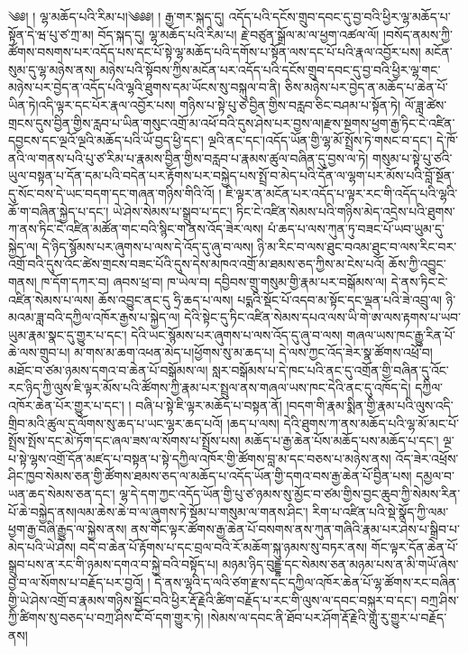 ༄༅། ། ལྷ་མཆོད་པའི་རིམ་པ།༄༅༅། ། རྒྱ་གར་སྐད་དུ། འདོད་པའི་དངོས་གྲུབ་དབང་དུ་བྱ་བའི་ཕྱིར་ལྷ་མཆོད་པ་སྟོན་དེ་ཝ་པུ་ཙ་ཀྲ་མ། བོད་སྐད་དུ། ལྷ་མཆོད་པའི་རིམ་པ། རྗེ་བཙུན་སྒྲོལ་མ་ལ་ཕྱག་འཚལ་ལོ། །བསོད་ནམས་ཀྱི་ཚོགས་བསགས་པར་འདོད་པས་དང་པོ་སྟེ་ལྷ་མཆོད་པའི་དགོས་པ་སྟོན་ལས་དང་པོ་པའི་རྣལ་འབྱོར་པས། མངོན་སུམ་དུ་ལྷ་མཉེས་ནས། མཉེས་པའི་སྟོབས་ཀྱིས་མངོན་པར་འདོད་པའི་དངོས་གྲུབ་དབང་དུ་བྱ་བའི་ཕྱིར་ལྷ་གང་མཉེས་པར་བྱེད་ན་འདོད་པའི་ལྷའི་ཐུགས་དམ་ཡོངས་སུ་བསྐུལ་བ་ནི། ཅིས་མཉེས་པར་བྱེད་ན་མཆོད་པ་ཆེན་པོ་ཡིན་ཏེ།འདི་ལྟར་དང་པོར་རྣལ་འབྱོར་པས། གཉིས་པ་སྟེ་པུ་ཙ་བྱིན་གྱིས་བརླབ་ཅིང་བཤམ་པ་སྟོན་ཏེ། ལོ་ཟླ་ཚེས་གྲངས་དུས་བྱིན་གྱིས་རླབ་པ་ཡིན་གསུང་འགྲོ་མ་འཕོ་བའི་དུས་ཤེས་པར་བྱས་ལ།རྫས་སྔགས་ཕྱག་རྒྱ་ཏིང་ངེ་འཛིན་དབྱངས་དང་ལྔའོ་ལྔའི་མཆོད་པའི་ཡོ་བྱད་ཕྱི་དང་། ལྔའི་ནང་དང་།འདོད་ཡོན་གྱི་ལྷ་མོ་སྤྲོས་ཏེ་གསང་བ་དང་། དེ་ཁོ་ནའི་ལ་གནས་པའི་པུ་ཙ་རིམ་པ་རྣམས་བྱིན་གྱིས་བརླབ་པ་རྣམས་ཚུལ་བཞིན་དུ་བྱས་ལ་ཏེ། གསུམ་པ་སྟེ་པུ་ཙའི་ཡུལ་བསྟན་པ་དོན་དམ་པའི་བདེན་པར་རྟོགས་པར་བསྐྱེད་པས་སྤྲོ་བ་མེད་པའི་དོན་ལ་ལྷག་པར་མོས་པའི་བློ་སྔོན་དུ་སོང་བས་དེ་ཡང་བདག་དང་གཞན་གཉིས་གིའི་འོ། ། ཇི་ལྟར་ན་མངོན་པར་འདོད་པ་ལྟར་རང་གི་འདོད་པའི་ལྷའི་ཆོ་ག་བཞིན་སྐྱེད་པ་དང་། ཡེ་ཤེས་སེམས་པ་སྒྲུབ་པ་དང་། ཏིང་ངེ་འཛིན་སེམས་པའི་གཉིས་མེད་འདྲེས་པའི་ཐུགས་ཀ་ནས་ཏིང་ངེ་འཛིན་མཚོན་གང་བའི་སྙིང་ག་ནས་འོད་ཟེར་ལས། པཾ་ཆད་པ་ལས་ཀུན་ཏུ་བཟང་པོ་ཡབ་ཡུམ་དུ་སྐྱེད་ལ། དེ་ཉིད་སྙོམས་པར་ཞུགས་པ་ལས་དེ་འོད་དུ་ཞུ་བ་ལས། ཉི་མ་རིང་བ་ལས་ཐུང་བའམ་ཐུང་བ་ལས་རིང་བར་འགྲོ་བའི་དུས་འོང་ཚེས་གྲངས་བཟང་པོའི་དུས་དེས་མཁའ་འགྲོ་མ་ཐམས་ཅད་ཀྱིས་མ་ངེས་པའོ། ཆོས་ཀྱི་འབྱུང་གནས། ཁ་དོག་དཀར་བ། ཞབས་ཕྲ་བ། ཁ་ཡེལ་བ། དབྱིབས་གྲུ་གསུམ་གྱི་རྣམ་པར་བསྒོམས་ལ། དེ་ནས་ཏིང་ངེ་འཛིན་སེམས་པ་ལས། ཆོས་འབྱུང་ནང་དུ ཧྲི་ཆད་པ་ལས། པདྨའི་སྡོང་པོ་འདབ་མ་སྟོང་དང་ལྡན་པའི་ཟེ་འབྲུ་ལ། ཉི་མའམ་ཟླ་བའི་དཀྱིལ་འཁོར་རྒྱས་པ་སྐྱེད་ལ། དེའི་སྟེང་དུ་ཏིང་འཛིན་སེམས་དཔའ་ལས་ཡི་གེ་ཨ་ལས་རྟགས་པ་ཡབ་ཡུམ་རྣམ་སྣང་དུ་གྱུར་པ་དང་། དེའི་ཡང་སྙོམས་པར་ཞུགས་པ་ལས་འོད་དུ་ཞུ་བ་ལས། གཞལ་ཡས་ཁང་རྒྱུ་རིན་པོ་ཆེ་ལས་གྲུབ་པ། མ་གས་མ་ཆག་འཕན་མེད་པ།ཕྱོགས་སུ་མ་ཆད་པ། དེ་ལས་ཀྱང་འོད་ཟེར་སྣ་ཚོགས་འཕྲོ་བ། མཐོང་བ་ཙམ་ཉམས་དགའ་བ་ཆེན་པོ་བསྒོམས་ལ། སླར་བསྒོམས་པ་དེ་ཁང་པའི་ནང་དུ་འགྲོན་གྱི་བཞིན་དུ་འོང་རང་ཉིད་ཀྱི་ལུས་ཇི་ལྟར་མོས་པའི་ཚོགས་ཀྱི་རྣམ་པར་སྤྲུལ་ནས་གཞལ་ཡས་ཁང་དེའི་ནང་དུ་འཁོད་དེ། དཀྱིལ་འཁོར་ཆེན་པོར་གྱུར་པ་དང་། ། བཞི་པ་སྟེ་ཇི་ལྟར་མཆོད་པ་བསྟན་ནོ། །བདག་གི་རྣམ་སྨིན་གྱི་རྣམ་པའི་ལུས་འདི་གྲིབ་མའི་ཚུལ་དུ་ལོགས་སུ་ཆད་པ་ཡང་ལྷར་ཆད་པའོ། །ཆད་པ་ལས། དེའི་ཐུགས་ཀ་ནས་མཆོད་པའི་ལྷ་མོ་མང་པོ་སྤྲོས་སྤོས་དང་མེ་ཏོག་དང་ཞལ་ཟས་ལ་སོགས་པ་སྤྲོས་པས། མཆོད་པ་རྒྱ་ཆེན་པོས་མཆོད་པས་མཆོད་པ་དང་། ལྔ་པ་སྟེ་ལྷས་འགྲོ་དོན་མཛད་པ་བསྟན་པ་སྟེ་དཀྱིལ་འཁོར་གྱི་ཚོགས་བླ་མ་དང་བཅས་པ་མཉེས་ནས། འོད་ཟེར་འཕྲོས་ཤིང་ཁྱབ་སེམས་ཅན་གྱི་ཚོགས་ཐམས་ཅད་ལ་མཆོད་པ་འདོད་ཡོན་གྱི་དགའ་བས་རྒྱ་ཆེན་པོ་བྱིན་པས། དམྱལ་བ་ཡན་ཆད་སེམས་ཅན་དང་། ལྷ་དེ་དག་ཀྱང་འདོད་ཡོན་གྱི་པུ་ཙ་ཉམས་སུ་མྱོང་བ་ཙམ་གྱིས་བྱང་ཆུབ་ཀྱི་སེམས་རིན་པོ་ཆེ་བསྐྱེད་ནས།ལམ་ཆེས་ཆེ་བ་ལ་ཞུགས་ཏེ་སྡོམ་པ་གསུམ་ལ་གནས་ཤིང་། རིག་པ་འཛིན་པའི་སྡེ་སྣོད་ཀྱི་ལམ་ཕྱག་རྒྱ་བཞི་རྒྱུད་ལ་སྐྱེས་ནས། ནས་གོང་ལྟར་ཚོགས་རྒྱ་ཆེན་པོ་བསགས་ནས་ཀུན་གཞིའི་རྣམ་པར་ཤེས་པ་སྒྲིབ་པ་མེད་པའི་ཡེ་ཤེས། བདེ་བ་ཆེན་པོ་རྟོགས་པ་དང་བྲལ་བའི་རོ་མཆོག་སྐུ་ཉམས་སུ་བཏར་ནས། གོང་ལྟར་དོན་ཆེན་པོ་སྒྲུབ་པས་ན་རང་གི་ཉམས་དགའ་བ་སྐྱེ་བའི་བསྟོད་པ། མཉམ་ཉིད་བུདྡྷ་དང་སེམས་ཅན་མཉམ་པས་ན་མི་གཡོ་ཞེས་བྱ་བ་ལ་སོགས་པ་བརྗོད་པར་བྱའོ། ། དེ་ནས་ལྷའི་ད་ལའི་ཙག་རྫས་དང་དཀྱིལ་འཁོར་ཆེན་པོ་ལྷ་ཚོགས་རང་བཞིན་གྱི་ཡེ་ཤེས་འགྲོ་བ་རྣམས་གཉིས་སྦྱོང་བའི་ཕྱིར་རྡོ་རྗེའི་ཚིག་བརྗོད་པ་རང་གི་ལུས་ལ་དབང་བསྐུར་བ་དང་། བཀྲ་ཤིས་ཀྱི་ཚིགས་སུ་བཅད་པ་བཀྲ་ཤིས་ངོ་བོ་དག་གྱུར་ཏེ། །སེམས་ལ་དབང་ནི་ཐོབ་པར་ཤོག་རྡོ་རྗེའི་གླུ་རུ་གྱུར་པ་བརྗོད་ནས། 